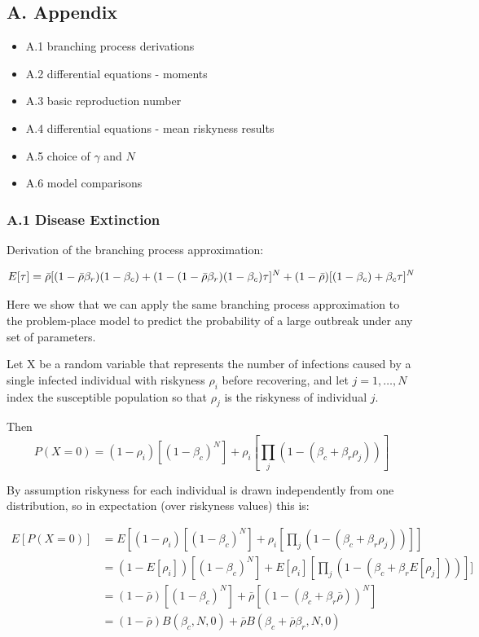 \subsection{A. Appendix}\label{a.-appendix}

\begin{itemize}
\tightlist
\item
  A.1 branching process derivations
\item
  A.2 differential equations - moments
\item
  A.3 basic reproduction number
\item
  A.4 differential equations - mean riskyness results
\item
  A.5 choice of \(\gamma\) and \(N\)
\item
  A.6 model comparisons
\end{itemize}

\subsubsection{A.1 Disease Extinction}\label{a.1-disease-extinction}

Derivation of the branching process approximation:

\[E[\tau] = \bar\rho [(1 - \bar\rho \beta_r)(1 - \beta_c) + 
                (1 - (1 - \bar\rho \beta_r)(1 - \beta_c) \tau]^N + 
   (1 - \bar\rho)[(1 - \beta_c) + \beta_c \tau]^N\\\]

Here we show that we can apply the same branching process approximation
to the problem-place model to predict the probability of a large
outbreak under any set of parameters.

Let X be a random variable that represents the number of infections
caused by a single infected individual with riskyness \(\rho_i\) before
recovering, and let \(j = 1, \ldots, N\) index the susceptible
population so that \(\rho_j\) is the riskyness of individual \(j\).

Then
\[P(X = 0) = (1 - \rho_i) [ (1 - \beta_c)^N ] + \rho_i [ \prod_j (1 - (\beta_c + \beta_r \rho_j)) ]\]

By assumption riskyness for each individual is drawn independently from
one distribution, so in expectation (over riskyness values) this is:

\[
\begin{aligned}
E[P(X = 0)] &= E[(1 - \rho_i) [ (1 - \beta_c)^N ] + \rho_i [ \prod_j (1 - (\beta_c + \beta_r \rho_j)) ]]\\
&= (1 - E[\rho_i]) [ (1 - \beta_c)^N ] + E[\rho_i] [ \prod_j (1 - (\beta_c + \beta_r E[\rho_j])) ]]\\
&= (1 - \bar\rho) [ (1 - \beta_c)^N ] + \bar\rho [(1 - (\beta_c + \beta_r \bar\rho))^N ]\\
&= (1 - \bar\rho) B(\beta_c, N, 0) + \bar\rho B(\beta_c + \bar\rho \beta_r, N, 0)\\
\end{aligned}
\]


